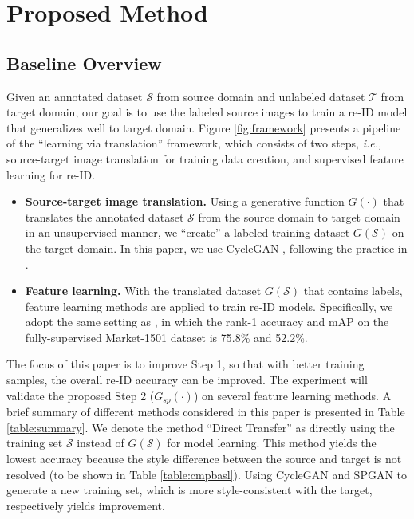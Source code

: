 \documentclass[10pt,twocolumn,letterpaper]{article}
\begin{document}
\section{Proposed Method} \label{Proposed Method}
\subsection{Baseline Overview}\label{sec:baseline}
Given an annotated dataset $\mathcal{S}$ from  source domain and unlabeled dataset $\mathcal{T}$ from  target domain, our goal is to use the labeled source images to train a re-ID model that generalizes well to target domain.  Figure \ref{fig:framework} presents a pipeline of the ``learning via translation'' framework, which consists of two steps, \emph{i.e.,} source-target image translation for training data creation, and supervised feature learning for re-ID.

\begin{itemize}
\setlength{\itemsep}{0.4ex} %
\item \textbf{Source-target image translation.} Using a generative function $G(\cdot)$ that translates the annotated dataset $\mathcal{S}$ from the source domain to target domain in an unsupervised manner, we ``create'' a labeled training dataset $G(\mathcal{S})$ on the target domain. In this paper, we use CycleGAN \cite{cycle}, following the practice in \cite{DBLP:journals/corr/LiuBK17, cycledomain}.

\item \textbf{Feature learning.} With the translated dataset $G(\mathcal{S})$ that contains labels, feature learning methods are applied to train re-ID models. Specifically, we adopt the same setting as \cite{DBLP:journals/corr/ZhengYH16}, in which the rank-1 accuracy and mAP on the fully-supervised Market-1501 dataset is 75.8\% and 52.2\%.
\end{itemize}

The focus of this paper is to improve Step 1, so that with better training samples, the overall re-ID accuracy can be improved. The experiment will validate the proposed Step 2 ($G_{sp}(\cdot)$) on several feature learning  methods. A brief summary of different methods considered in this paper is presented in Table \ref{table:summary}. We denote the method ``Direct Transfer'' as directly using the training set $\mathcal{S}$ instead of $G(\mathcal{S})$ for model learning. This method yields the lowest accuracy because the style difference between the source and target is not resolved (to be shown in Table \ref{table:cmpbasl}). Using CycleGAN and SPGAN to generate a new training set, which is more style-consistent with the target, respectively yields improvement.
\end{document}
